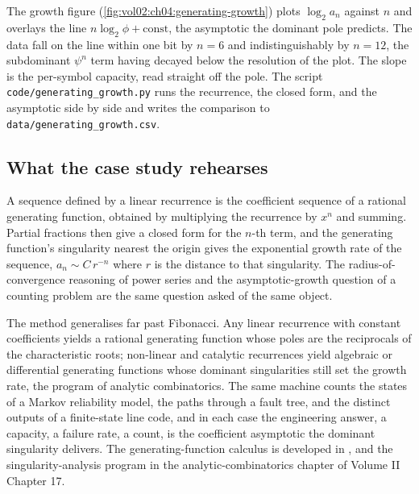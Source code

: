

The growth figure (\autoref{fig:vol02:ch04:generating-growth}) plots
$\log_{2} a_{n}$ against $n$ and overlays the line $n\log_{2}\phi +
\text{const}$, the asymptotic the dominant pole predicts. The data fall
on the line within one bit by $n = 6$ and indistinguishably by $n =
12$, the subdominant $\psi^{n}$ term having decayed below the resolution
of the plot. The slope is the per-symbol capacity, read straight off the
pole. The script
\texttt{code/generating\_growth.py} runs the recurrence, the closed
form, and the asymptotic side by side and writes the comparison to
\texttt{data/generating\_growth.csv}.

\subsection{What the case study rehearses}

\begin{principle}
A sequence defined by a linear recurrence is the coefficient sequence of
a rational generating function, obtained by multiplying the recurrence
by $x^{n}$ and summing. Partial fractions then give a closed form for
the $n$-th term, and the generating function's singularity nearest the
origin gives the exponential growth rate of the sequence, $a_{n} \sim
C\,r^{-n}$ where $r$ is the distance to that singularity. The radius-of-
convergence reasoning of power series and the asymptotic-growth question
of a counting problem are the same question asked of the same object.
\end{principle}

The method generalises far past Fibonacci. Any linear recurrence with
constant coefficients yields a rational generating function whose poles
are the reciprocals of the characteristic roots; non-linear and
catalytic recurrences yield algebraic or differential generating
functions whose dominant singularities still set the growth rate, the
program of analytic combinatorics. The same machine counts the states of
a Markov reliability model, the paths through a fault tree, and the
distinct outputs of a finite-state line code, and in each case the
engineering answer, a capacity, a failure rate, a count, is the
coefficient asymptotic the dominant singularity delivers. The
generating-function calculus is developed in
\cite{text:v2ch17-graham-knuth-patashnik}, and the singularity-analysis
program in the analytic-combinatorics chapter of Volume II Chapter 17.

